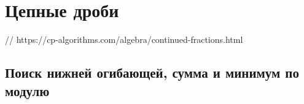 \section{Цепные дроби}
// https://cp-algorithms.com/algebra/continued-fractions.html
\subsection{Поиск нижней огибающей, сумма и минимум по модулю}
